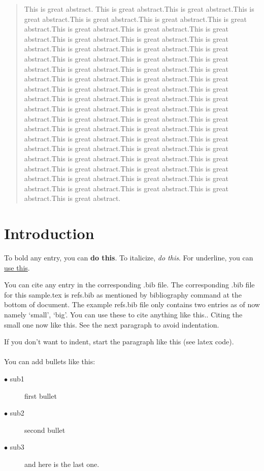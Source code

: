 \documentclass{nithreport}
\begin{document}
\tableofcontents
\listoftables
\listoffigures

\begin{abstract}
This is great abstract. This is great abstract.This is great abstract.This is great abstract.This is great abstract.This is great abstract.This is great abstract.This is great abstract.This is great abstract.This is great abstract.This is great abstract.This is great abstract.This is great abstract.This is great abstract.This is great abstract.This is great abstract.This is great abstract.This is great abstract.This is great abstract.This is great abstract.This is great abstract.This is great abstract.This is great abstract.This is great abstract.This is great abstract.This is great abstract.This is great abstract.This is great abstract.This is great abstract.This is great abstract.This is great abstract.This is great abstract.This is great abstract.This is great abstract.This is great abstract.This is great abstract.This is great abstract.This is great abstract.This is great abstract.This is great abstract.This is great abstract.This is great abstract.This is great abstract.This is great abstract.This is great abstract.This is great abstract.This is great abstract.This is great abstract.This is great abstract.This is great abstract.This is great abstract.This is great abstract.This is great abstract.This is great abstract.This is great abstract.This is great abstract.This is great abstract.This is great abstract.This is great abstract.
\end{abstract}


\chapter{Introduction}
To bold any entry, you can {\bf do this}. To italicize, {\it do this}. For underline, you can \underline{use this}.

You can cite any entry in the corresponding .bib file. The corresponding .bib file for this sample.tex is refs.bib as mentioned by bibliography command at the bottom of document. The example refs.bib file only contains two entries as of now namely `small', `big'. You can use these to cite anything like this.\cite{big}. Citing the small one now like this\cite{small}. See the next paragraph to avoid indentation.

\noindent If you don't want to indent, start the paragraph like this (see latex code).
\\ \\
\noindent You can add bullets like this:
\begin{description}
  \item[$\bullet$ sub1] first bullet
  \item[$\bullet$ sub2] second bullet
  \item[$\bullet$ sub3] and here is the last one.
\end{description}
\end{document}
